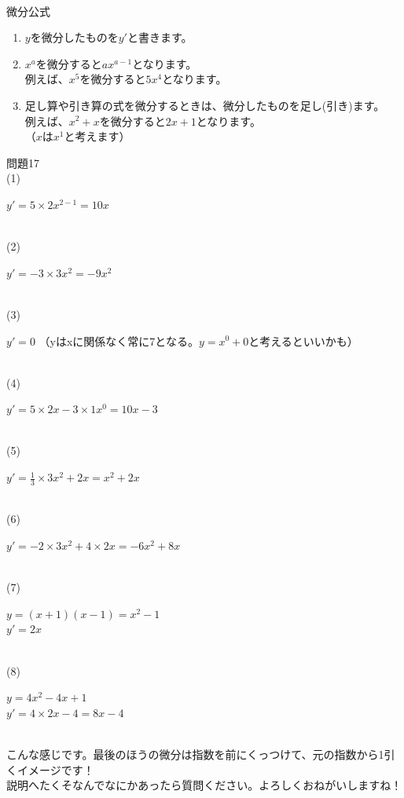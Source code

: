 \documentclass{jsarticle}
\newenvironment{indentblock}{\begin{adjustwidth}{\parindent}{}\hspace{-\parindent}}{\end{adjustwidth}}
\begin{document}
\hrulefill\\
\begin{itembox}[l]{微分公式}
\begin{enumerate}
\item $y$を微分したものを$y'$と書きます。
\item $x^a$を微分すると$ax^{a-1}$となります。\\
例えば、$x^5$を微分すると$5x^4$となります。
\item 足し算や引き算の式を微分するときは、微分したものを足し(引き)ます。\\
例えば、$x^2+x$を微分すると$2x+1$となります。\\
（$x$は$x^1$と考えます）
\end{enumerate}
\end{itembox}
問題17\\
(1)
\begin{indentblock}
$y'=5\times 2x^{2-1}=10x$
\end{indentblock}
\dotfill\\
(2)
\begin{indentblock}
$y'=-3\times 3x^2=-9x^2$
\end{indentblock}
\dotfill\\
(3)
\begin{indentblock}
$y'=0$
（yはxに関係なく常に7となる。$y=x^0+0$と考えるといいかも）
\end{indentblock}
\dotfill\\
(4)
\begin{indentblock}
$y'=5\times 2x-3\times 1x^0=10x-3$
\end{indentblock}
\dotfill\\
(5)
\begin{indentblock}
$y'=\frac{1}{3}\times 3x^2+2x=x^2+2x$
\end{indentblock}
\dotfill\\
(6)
\begin{indentblock}
$y'=-2\times 3x^2+4\times 2x=-6x^2+8x$
\end{indentblock}
\dotfill\\
(7)
\begin{indentblock}
$y=(x+1)(x-1)=x^2-1$\\
$y'=2x$
\end{indentblock}
\dotfill\\
(8)
\begin{indentblock}
$y=4x^2-4x+1$\\
$y'=4\times 2x-4=8x-4$
\end{indentblock}
\hrulefill\\
こんな感じです。最後のほうの微分は指数を前にくっつけて、元の指数から1引くイメージです！\\
説明へたくそなんでなにかあったら質問ください。よろしくおねがいしますね！
\end{document}
